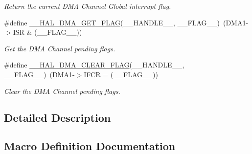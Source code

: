 \begin{DoxyCompactItemize}
\begin{DoxyCompactList}\small\item\em Return the current D\+MA Channel Global interrupt flag. \end{DoxyCompactList}\item 
\#define \hyperlink{group___d_m_a___low__density___medium__density___product__devices_ga798d4b3b3fbd32b95540967bb35b35be}{\+\_\+\+\_\+\+H\+A\+L\+\_\+\+D\+M\+A\+\_\+\+G\+E\+T\+\_\+\+F\+L\+AG}(\+\_\+\+\_\+\+H\+A\+N\+D\+L\+E\+\_\+\+\_\+,  \+\_\+\+\_\+\+F\+L\+A\+G\+\_\+\+\_\+)~(D\+M\+A1-\/$>$I\+SR \& (\+\_\+\+\_\+\+F\+L\+A\+G\+\_\+\+\_\+))
\begin{DoxyCompactList}\small\item\em Get the D\+MA Channel pending flags. \end{DoxyCompactList}\item 
\#define \hyperlink{group___d_m_a___low__density___medium__density___product__devices_gabc041fb1c85ea7a3af94e42470ef7f2a}{\+\_\+\+\_\+\+H\+A\+L\+\_\+\+D\+M\+A\+\_\+\+C\+L\+E\+A\+R\+\_\+\+F\+L\+AG}(\+\_\+\+\_\+\+H\+A\+N\+D\+L\+E\+\_\+\+\_\+,  \+\_\+\+\_\+\+F\+L\+A\+G\+\_\+\+\_\+)~(D\+M\+A1-\/$>$I\+F\+CR = (\+\_\+\+\_\+\+F\+L\+A\+G\+\_\+\+\_\+))
\begin{DoxyCompactList}\small\item\em Clear the D\+MA Channel pending flags. \end{DoxyCompactList}\end{DoxyCompactItemize}


\subsection{Detailed Description}


\subsection{Macro Definition Documentation}
\mbox{\label{group___d_m_a___low__density___medium__density___product__devices_gabc041fb1c85ea7a3af94e42470ef7f2a}} 
